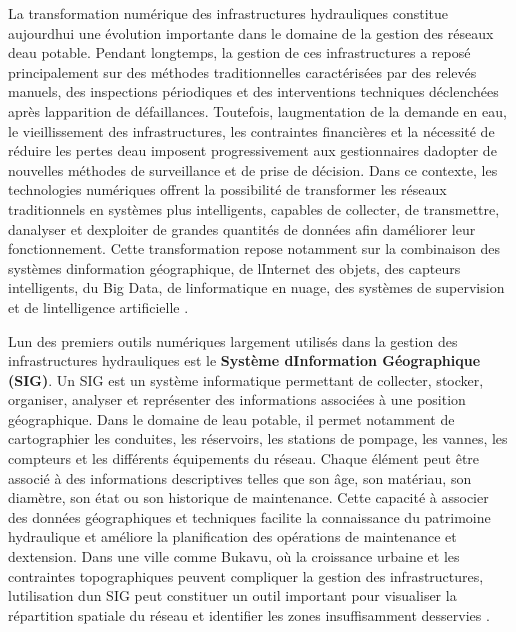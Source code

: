 \documentclass[12pt,a4paper,oneside]{report}
\begin{document}
La transformation numérique des infrastructures hydrauliques constitue
aujourd\textquotesingle hui une évolution importante dans le domaine de
la gestion des réseaux d\textquotesingle eau potable. Pendant longtemps,
la gestion de ces infrastructures a reposé principalement sur des
méthodes traditionnelles caractérisées par des relevés manuels, des
inspections périodiques et des interventions techniques déclenchées
après l\textquotesingle apparition de défaillances. Toutefois,
l\textquotesingle augmentation de la demande en eau, le vieillissement
des infrastructures, les contraintes financières et la nécessité de
réduire les pertes d\textquotesingle eau imposent progressivement aux
gestionnaires d\textquotesingle adopter de nouvelles méthodes de
surveillance et de prise de décision. Dans ce contexte, les technologies
numériques offrent la possibilité de transformer les réseaux
traditionnels en systèmes plus intelligents, capables de collecter, de
transmettre, d\textquotesingle analyser et d\textquotesingle exploiter
de grandes quantités de données afin d\textquotesingle améliorer leur
fonctionnement. Cette transformation repose notamment sur la combinaison
des systèmes d\textquotesingle information géographique, de
l\textquotesingle Internet des objets, des capteurs intelligents, du Big
Data, de l\textquotesingle informatique en nuage, des systèmes de
supervision et de l\textquotesingle intelligence artificielle \cite{ref42}.

L\textquotesingle un des premiers outils numériques largement utilisés
dans la gestion des infrastructures hydrauliques est le \textbf{Système
d\textquotesingle Information Géographique (SIG)}. Un SIG est un système
informatique permettant de collecter, stocker, organiser, analyser et
représenter des informations associées à une position géographique. Dans
le domaine de l\textquotesingle eau potable, il permet notamment de
cartographier les conduites, les réservoirs, les stations de pompage,
les vannes, les compteurs et les différents équipements du réseau.
Chaque élément peut être associé à des informations descriptives telles
que son âge, son matériau, son diamètre, son état ou son historique de
maintenance. Cette capacité à associer des données géographiques et
techniques facilite la connaissance du patrimoine hydraulique et
améliore la planification des opérations de maintenance et
d\textquotesingle extension. Dans une ville comme Bukavu, où la
croissance urbaine et les contraintes topographiques peuvent compliquer
la gestion des infrastructures, l\textquotesingle utilisation
d\textquotesingle un SIG peut constituer un outil important pour
visualiser la répartition spatiale du réseau et identifier les zones
insuffisamment desservies \cite{ref52}.
\end{document}
